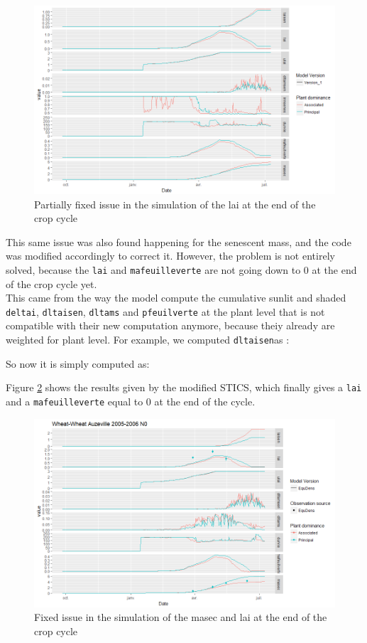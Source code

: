 \documentclass[]{book}
\begin{document}
\begin{figure}
\centering
\includegraphics{img/ReSenFixed.png}
\caption{\label{fig:ReSenFixed}Partially fixed issue in the simulation of the lai at the end of the crop cycle}
\end{figure}

This same issue was also found happening for the senescent mass, and the code was modified accordingly to correct it. However, the problem is not entirely solved, because the \texttt{lai} and \texttt{mafeuilleverte} are not going down to 0 at the end of the crop cycle yet.\\
This came from the way the model compute the cumulative sunlit and shaded \texttt{deltai}, \texttt{dltaisen}, \texttt{dltams} and \texttt{pfeuilverte} at the plant level that is not compatible with their new computation anymore, because theiy already are weighted for plant level.
For example, we computed \texttt{dltaisen}as :

So now it is simply computed as:

Figure \ref{fig:ReSenFixed2} shows the results given by the modified STICS, which finally gives a \texttt{lai} and a \texttt{mafeuilleverte} equal to 0 at the end of the cycle.

\begin{figure}
\centering
\includegraphics{img/ReSenFixed2.png}
\caption{\label{fig:ReSenFixed2}Fixed issue in the simulation of the masec and lai at the end of the crop cycle}
\end{figure}
\end{document}
